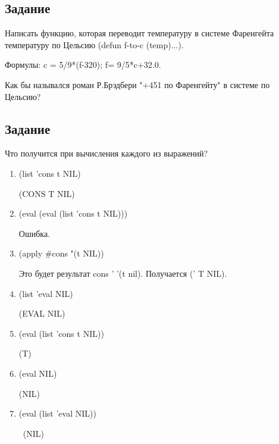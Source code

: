 \subsection{Задание }

 Написать функцию, которая переводит температуру в системе Фаренгейта температуру по Цельсию (defun f-to-c (temp)...).
 
Формулы: c = 5/9*(f-320); f= 9/5*c+32.0.

Как бы назывался роман Р.Брэдбери "+451 по Фаренгейту" в системе по Цельсию?


\subsection{Задание }

Что получится при вычисления каждого из выражений?

\begin{enumerate}[label*=\arabic*.]
	\item (list 'cons t NIL)
	
	(CONS T NIL)
	
	\item (eval (eval (list 'cons t NIL)))
	
 	Ошибка.
	
	\item (apply \#cons "(t NIL))
	
	Это будет  результат cons '  '(t nil). Получается (' T NIL).
	
	\item (list 'eval NIL)
	
	(EVAL NIL)

	\item (eval (list 'cons t NIL))
	
	(T)
	
	\item (eval NIL)
	
	(NIL)
	
	\item  (eval (list 'eval NIL))
	
	 (NIL)
	
\end{enumerate} 


